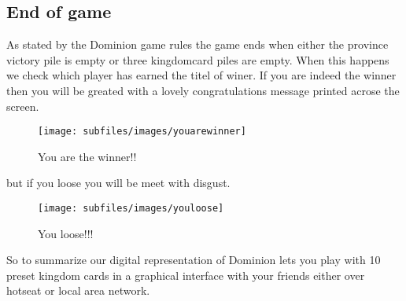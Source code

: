 \subsection{End of game}
As stated by the Dominion game rules the game ends when either the province victory pile is empty or three kingdomcard piles are empty. When this happens we check which player has earned the titel of winer. If you are indeed the winner then you will be greated with a lovely congratulations message printed acrose the screen.
\begin{figure}[h!]
\centering
\texttt{[image: subfiles/images/youarewinner]}
\caption{You are the winner!!}
\end{figure}
but if you loose you will be meet with disgust.
\begin{figure}[h!]
\centering
\texttt{[image: subfiles/images/youloose]}
\caption{You loose!!!}
\end{figure}
So to summarize our digital representation of Dominion lets you play with 10 preset kingdom cards in a graphical interface with your friends either over hotseat or local area network.
 